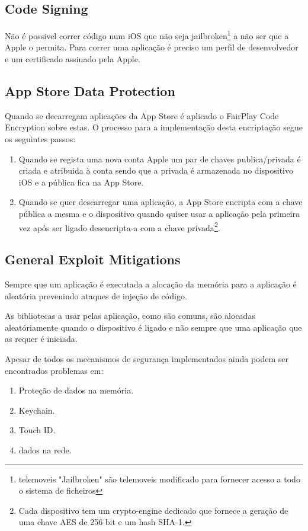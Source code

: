 \subsection{ Code Signing}
\hfill\par
	Não é possivel correr código num iOS que não seja jailbroken\footnote[3]{telemoveis "Jailbroken" são telemoveis modificado para fornecer acesso a todo o sistema de ficheiros\cite{ref_intro2}} a não ser que a Apple o permita. Para correr uma aplicação é preciso um perfil de desenvolvedor e um certificado assinado pela Apple.


\subsection{ App Store Data Protection}
\hfill\par
	Quando se decarregam aplicações da App Store é aplicado o FairPlay Code Encryption sobre estas. O processo para a implementação desta encriptação segue os seguintes passos:\par
	\begin{enumerate}
	\item Quando se regista uma nova conta Apple um par de chaves publica/privada é criada e atribuida à conta sendo que a privada é armazenada no dispositivo iOS e a pública fica na App Store.\par
	\item Quando se quer descarregar uma aplicação, a App Store encripta com a chave pública a mesma e o dispositivo quando quiser usar a aplicação pela primeira vez após ser ligado desencripta-a com a chave privada\footnote[3]{Cada dispositivo tem um crypto-engine dedicado que fornece a geração de uma chave AES de 256 bit e um hash SHA-1.}.\par
\end{enumerate}

\subsection{ General Exploit Mitigations}
\hfill\par
	Sempre que um aplicação é executada a alocação da memória para a aplicação é aleatória prevenindo ataques de injeção de código.\par
	As bibliotecas a usar pelas aplicação, como são comuns, são alocadas aleatóriamente quando o dispositivo é ligado e não sempre que uma aplicação que as requer é iniciada.\par
\hfill\par
\hfill\par
Apesar de todos os mecanismos de segurança implementados ainda podem ser encontrados problemas em:
\renewcommand{\theenumi}{\Roman{enumi}}
\begin{enumerate}
	\item Proteção de dados na memória.
	\item Keychain.
	\item Touch ID.
	\item dados na rede.
\end{enumerate}
\renewcommand{\theenumi}{\arabic{enumi}}


